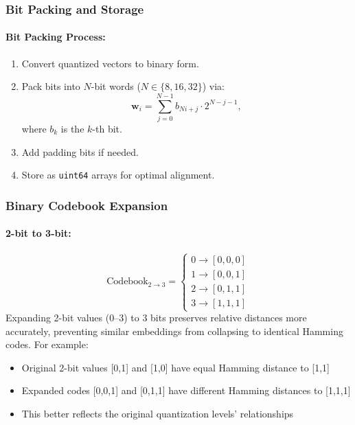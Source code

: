 \subsubsection{Bit Packing and Storage}
\paragraph{Bit Packing Process:}
\begin{enumerate}
    \item Convert quantized vectors to binary form. 
    \item Pack bits into $N$-bit words ($N \in \{8,16,32\}$) via:
    \begin{equation}
        \mathbf{w}_i = \sum_{j=0}^{N-1} b_{Ni+j} \cdot 2^{N-j-1},
    \end{equation}
    where $b_k$ is the $k$-th bit.
    \item Add padding bits if needed.
    \item Store as \texttt{uint64} arrays for optimal alignment.
\end{enumerate}

\subsubsection{Binary Codebook Expansion}
\paragraph{2-bit to 3-bit:}
\begin{equation}
\text{Codebook}_{2\rightarrow3} =
\begin{cases}
0 \rightarrow [0,0,0]\\
1 \rightarrow [0,0,1]\\
2 \rightarrow [0,1,1]\\
3 \rightarrow [1,1,1]
\end{cases}
\end{equation}
Expanding 2-bit values (0--3) to 3 bits preserves relative distances more accurately, preventing similar embeddings from collapsing to identical Hamming codes.
For example:
\begin{itemize}
    \item Original 2-bit values [0,1] and [1,0] have equal Hamming distance to [1,1]
    \item Expanded codes [0,0,1] and [0,1,1] have different Hamming distances to [1,1,1]
    \item This better reflects the original quantization levels' relationships
\end{itemize}

